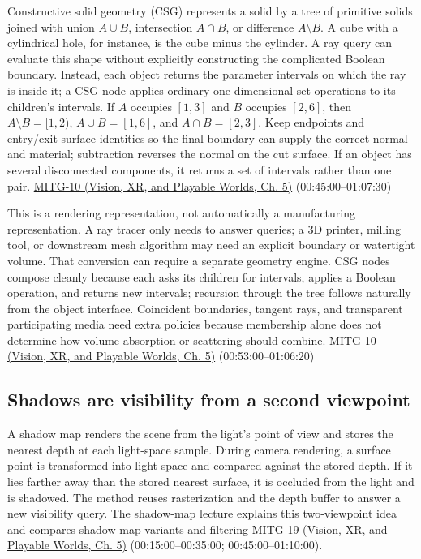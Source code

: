 Constructive solid geometry (CSG) represents a solid by a tree of primitive solids joined with union \(A\cup B\), intersection \(A\cap B\), or difference \(A\setminus B\). A cube with a cylindrical hole, for instance, is the cube minus the cylinder. A ray query can evaluate this shape without explicitly constructing the complicated Boolean boundary. Instead, each object returns the parameter intervals on which the ray is inside it; a CSG node applies ordinary one-dimensional set operations to its children's intervals. If \(A\) occupies \([1,3]\) and \(B\) occupies \([2,6]\), then \(A\setminus B=[1,2)\), \(A\cup B=[1,6]\), and \(A\cap B=[2,3]\). Keep endpoints and entry/exit surface identities so the final boundary can supply the correct normal and material; subtraction reverses the normal on the cut surface. If an object has several disconnected components, it returns a set of intervals rather than one pair. \href{../07-Vision-XR-and-Playable-Worlds/main.pdf\#nameddest=04-visual-computing-ii-ch036-mitg-10---ray-casting-ii}{MITG-10 (Vision, XR, and Playable Worlds, Ch. 5)} (00:45:00--01:07:30)

This is a rendering representation, not automatically a manufacturing representation. A ray tracer only needs to answer queries; a 3D printer, milling tool, or downstream mesh algorithm may need an explicit boundary or watertight volume. That conversion can require a separate geometry engine. CSG nodes compose cleanly because each asks its children for intervals, applies a Boolean operation, and returns new intervals; recursion through the tree follows naturally from the object interface. Coincident boundaries, tangent rays, and transparent participating media need extra policies because membership alone does not determine how volume absorption or scattering should combine. \href{../07-Vision-XR-and-Playable-Worlds/main.pdf\#nameddest=04-visual-computing-ii-ch036-mitg-10---ray-casting-ii}{MITG-10 (Vision, XR, and Playable Worlds, Ch. 5)} (00:53:00--01:06:20)

\subsection{Shadows are visibility from a second viewpoint}\label{04-visual-computing-ii-ch028-shadows-are-visibility-from-a-second-viewpoint}

A shadow map renders the scene from the light's point of view and stores the nearest depth at each light-space sample. During camera rendering, a surface point is transformed into light space and compared against the stored depth. If it lies farther away than the stored nearest surface, it is occluded from the light and is shadowed. The method reuses rasterization and the depth buffer to answer a new visibility query. The shadow-map lecture explains this two-viewpoint idea and compares shadow-map variants and filtering \href{../07-Vision-XR-and-Playable-Worlds/main.pdf\#nameddest=04-visual-computing-ii-ch036-mitg-19---shadow-maps}{MITG-19 (Vision, XR, and Playable Worlds, Ch. 5)} (00:15:00--00:35:00; 00:45:00--01:10:00).

